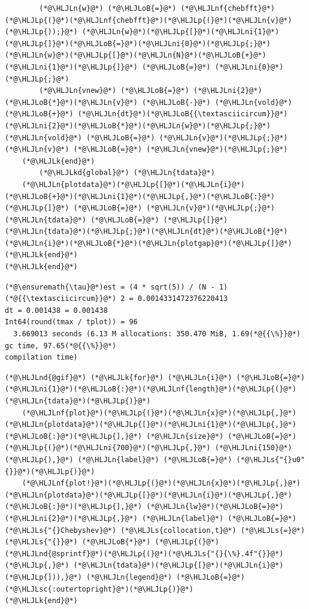 \documentclass[12pt,a4paper]{article}
\newcommand{\HLJLk}[1]{\textcolor[RGB]{148,91,176}{\textbf{#1}}}
\newcommand{\HLJLkd}[1]{\textcolor[RGB]{214,102,97}{\textit{#1}}}
\newcommand{\HLJLn}[1]{#1}
\newcommand{\HLJLnd}[1]{\textcolor[RGB]{214,102,97}{#1}}
\newcommand{\HLJLnf}[1]{\textcolor[RGB]{66,102,213}{#1}}
\newcommand{\HLJLs}[1]{\textcolor[RGB]{201,61,57}{#1}}
\newcommand{\HLJLsc}[1]{\textcolor[RGB]{201,61,57}{#1}}
\newcommand{\HLJLni}[1]{\textcolor[RGB]{59,151,46}{#1}}
\newcommand{\HLJLoB}[1]{\textcolor[RGB]{102,102,102}{\textbf{#1}}}
\newcommand{\HLJLp}[1]{#1}
\begin{document}
\begin{lstlisting}
        (*@\HLJLn{w}@*) (*@\HLJLoB{=}@*) (*@\HLJLnf{chebfft}@*)(*@\HLJLp{(}@*)(*@\HLJLnf{chebfft}@*)(*@\HLJLp{(}@*)(*@\HLJLn{v}@*)(*@\HLJLp{));}@*) (*@\HLJLn{w}@*)(*@\HLJLp{[}@*)(*@\HLJLni{1}@*)(*@\HLJLp{]}@*)(*@\HLJLoB{=}@*)(*@\HLJLni{0}@*)(*@\HLJLp{;}@*) (*@\HLJLn{w}@*)(*@\HLJLp{[}@*)(*@\HLJLn{N}@*)(*@\HLJLoB{+}@*)(*@\HLJLni{1}@*)(*@\HLJLp{]}@*) (*@\HLJLoB{=}@*) (*@\HLJLni{0}@*)(*@\HLJLp{;}@*)
        (*@\HLJLn{vnew}@*) (*@\HLJLoB{=}@*) (*@\HLJLni{2}@*)(*@\HLJLoB{*}@*)(*@\HLJLn{v}@*) (*@\HLJLoB{-}@*) (*@\HLJLn{vold}@*) (*@\HLJLoB{+}@*) (*@\HLJLn{dt}@*)(*@\HLJLoB{{\textasciicircum}}@*)(*@\HLJLni{2}@*)(*@\HLJLoB{*}@*)(*@\HLJLn{w}@*)(*@\HLJLp{;}@*) (*@\HLJLn{vold}@*) (*@\HLJLoB{=}@*) (*@\HLJLn{v}@*)(*@\HLJLp{;}@*) (*@\HLJLn{v}@*) (*@\HLJLoB{=}@*) (*@\HLJLn{vnew}@*)(*@\HLJLp{;}@*)
    (*@\HLJLk{end}@*)
        (*@\HLJLkd{global}@*) (*@\HLJLn{tdata}@*)
    (*@\HLJLn{plotdata}@*)(*@\HLJLp{[}@*)(*@\HLJLn{i}@*)(*@\HLJLoB{+}@*)(*@\HLJLni{1}@*)(*@\HLJLp{,}@*)(*@\HLJLoB{:}@*)(*@\HLJLp{]}@*) (*@\HLJLoB{=}@*) (*@\HLJLn{v}@*)(*@\HLJLp{;}@*) (*@\HLJLn{tdata}@*) (*@\HLJLoB{=}@*) (*@\HLJLp{[}@*)(*@\HLJLn{tdata}@*)(*@\HLJLp{;}@*)(*@\HLJLn{dt}@*)(*@\HLJLoB{*}@*)(*@\HLJLn{i}@*)(*@\HLJLoB{*}@*)(*@\HLJLn{plotgap}@*)(*@\HLJLp{]}@*)
(*@\HLJLk{end}@*)
(*@\HLJLk{end}@*)
\end{lstlisting}

\begin{lstlisting}
(*@\ensuremath{\tau}@*)est = (4 * sqrt(5)) / (N - 1) (*@{{\textasciicircum}}@*) 2 = 0.0014331472376220413
dt = 0.001438 = 0.001438
Int64(round(tmax / tplot)) = 96
  3.669013 seconds (6.13 M allocations: 350.470 MiB, 1.69(*@{{\%}}@*) gc time, 97.65(*@{{\%}}@*) 
compilation time)
\end{lstlisting}


\begin{lstlisting}
(*@\HLJLnd{@gif}@*) (*@\HLJLk{for}@*) (*@\HLJLn{i}@*) (*@\HLJLoB{=}@*) (*@\HLJLni{1}@*)(*@\HLJLoB{:}@*)(*@\HLJLnf{length}@*)(*@\HLJLp{(}@*)(*@\HLJLn{tdata}@*)(*@\HLJLp{)}@*)
    (*@\HLJLnf{plot}@*)(*@\HLJLp{(}@*)(*@\HLJLn{x}@*)(*@\HLJLp{,}@*) (*@\HLJLn{plotdata}@*)(*@\HLJLp{[}@*)(*@\HLJLni{1}@*)(*@\HLJLp{,}@*)(*@\HLJLoB{:}@*)(*@\HLJLp{],}@*) (*@\HLJLn{size}@*) (*@\HLJLoB{=}@*) (*@\HLJLp{(}@*)(*@\HLJLni{700}@*)(*@\HLJLp{,}@*) (*@\HLJLni{150}@*)(*@\HLJLp{),}@*) (*@\HLJLn{label}@*) (*@\HLJLoB{=}@*) (*@\HLJLs{"{}u0"{}}@*)(*@\HLJLp{)}@*)
    (*@\HLJLnf{plot!}@*)(*@\HLJLp{(}@*)(*@\HLJLn{x}@*)(*@\HLJLp{,}@*) (*@\HLJLn{plotdata}@*)(*@\HLJLp{[}@*)(*@\HLJLn{i}@*)(*@\HLJLp{,}@*)(*@\HLJLoB{:}@*)(*@\HLJLp{],}@*) (*@\HLJLn{lw}@*)(*@\HLJLoB{=}@*)(*@\HLJLni{2}@*)(*@\HLJLp{,}@*) (*@\HLJLn{label}@*) (*@\HLJLoB{=}@*) (*@\HLJLs{"{}Chebyshev}@*) (*@\HLJLs{collocation,t}@*) (*@\HLJLs{=}@*) (*@\HLJLs{"{}}@*) (*@\HLJLoB{*}@*) (*@\HLJLp{(}@*)(*@\HLJLnd{@sprintf}@*)(*@\HLJLp{(}@*)(*@\HLJLs{"{}{\%}.4f"{}}@*)(*@\HLJLp{,}@*) (*@\HLJLn{tdata}@*)(*@\HLJLp{[}@*)(*@\HLJLn{i}@*)(*@\HLJLp{])),}@*) (*@\HLJLn{legend}@*) (*@\HLJLoB{=}@*) (*@\HLJLsc{:outertopright}@*)(*@\HLJLp{)}@*)
(*@\HLJLk{end}@*)
\end{lstlisting}
\end{document}
